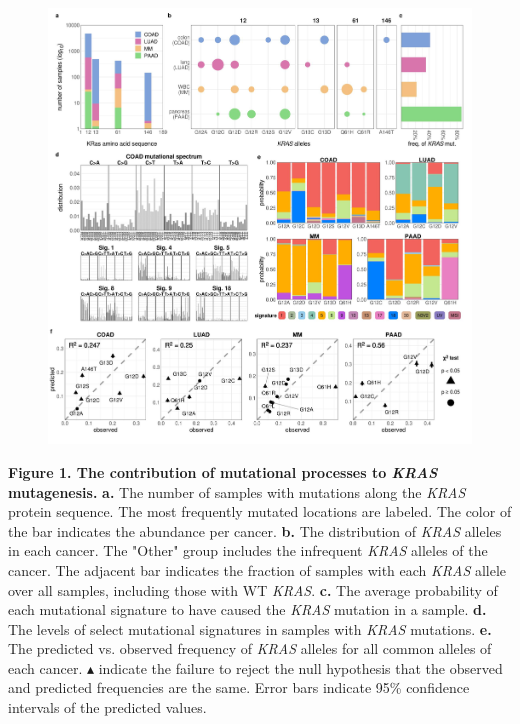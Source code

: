\documentclass[english, 10pt, letterpaper]{article}
\newcommand{\KRAS}{\emph{KRAS}}
\begin{document}
\begin{figure}[h!]
\centering
\includegraphics[width=180mm]{figures/Fig_1.jpeg}
\label{fig:mutational-signatures-main}
\end{figure}

\noindent \textbf{Figure 1. The contribution of mutational processes to \KRAS{} mutagenesis.}
\textbf{a.} The number of samples with mutations along the \KRAS{} protein sequence. The most frequently mutated locations are labeled. The color of the bar indicates the abundance per cancer. 
\textbf{b.} The distribution of \KRAS{} alleles in each cancer. The "Other" group includes the infrequent \KRAS{} alleles of the cancer. The adjacent bar indicates the fraction of samples with each \KRAS{} allele over all samples, including those with WT \KRAS{}.
\textbf{c.} The average probability of each mutational signature to have caused the \KRAS{} mutation in a sample.
\textbf{d.} The levels of select mutational signatures in samples with \KRAS{} mutations.
\textbf{e.} The predicted vs. observed frequency of \KRAS{} alleles for all common alleles of each cancer. $\blacktriangle$ indicate the failure to reject the null hypothesis that the observed and predicted frequencies are the same. Error bars indicate 95\% confidence intervals of the predicted values.
\newpage
\end{document}
